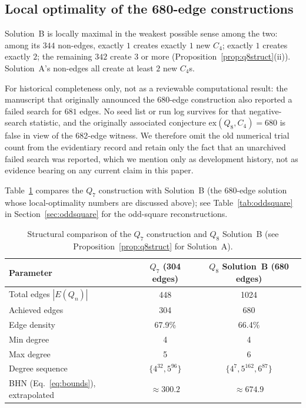 \documentclass[12pt,a4paper]{article}
\theoremstyle{definition}
\newcommand{\ex}{\mathrm{ex}}
\begin{document}
\subsection{Local optimality of the 680-edge constructions}

Solution~B is locally maximal in the weakest possible sense among the
two: among its $344$ non-edges, exactly $1$ creates exactly $1$ new
$C_4$; exactly $1$ creates exactly $2$; the remaining $342$ create $3$
or more (Proposition~\ref{prop:q8struct}(ii)). Solution~A's non-edges
all create at least $2$ new $C_4$s.

For historical completeness only, not as a reviewable computational
result: the manuscript that originally announced the $680$-edge
construction also reported a failed search for $681$ edges. No seed list or
run log survives for that negative-search statistic, and the originally
associated conjecture $\ex(Q_8,C_4)=680$ is false in view of the 682-edge
witness. We therefore omit the old numerical trial count from the evidentiary
record and retain only the fact that an unarchived failed search was reported,
which we mention only as
development history, not as evidence bearing on any current claim in
this paper.

Table~\ref{tab:compare} compares the $Q_7$ construction with Solution~B
(the 680-edge solution whose local-optimality numbers are discussed
above); see Table~\ref{tab:oddsquare} in Section~\ref{sec:oddsquare} for
the odd-square reconstructions.

\begin{table}[ht]
\centering
\caption{Structural comparison of the $Q_7$ construction and $Q_8$
  Solution~B (see Proposition~\ref{prop:q8struct} for Solution~A).}
\label{tab:compare}\medskip
\begin{tabular}{lcc}
\toprule
Parameter & $Q_7$ (304 edges) & $Q_8$ Solution~B (680 edges)\\
\midrule
Total edges $|E(Q_n)|$ & 448 & 1024\\
Achieved edges & 304 & 680\\
Edge density & 67.9\% & 66.4\%\\
Min degree & 4 & 4\\
Max degree & 5 & 6\\
Degree sequence & $\{4^{32},5^{96}\}$ & $\{4^7,5^{162},6^{87}\}$\\
BHN (Eq.~\ref{eq:bounds}), extrapolated & $\approx300.2$ & $\approx674.9$\\
\bottomrule
\end{tabular}
\end{table}
\end{document}
